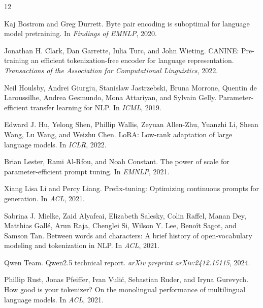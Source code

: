 \documentclass{article}
\begin{document}
\begin{thebibliography}{12}

Kaj Bostrom and Greg Durrett.
\newblock Byte pair encoding is suboptimal for language model pretraining.
\newblock In \emph{Findings of EMNLP}, 2020.

Jonathan H. Clark, Dan Garrette, Iulia Turc, and John Wieting.
\newblock CANINE: Pre-training an efficient tokenization-free encoder for language representation.
\newblock \emph{Transactions of the Association for Computational Linguistics}, 2022.

Neil Houlsby, Andrei Giurgiu, Stanislaw Jastrzebski, Bruna Morrone, Quentin de Laroussilhe, Andrea Gesmundo, Mona Attariyan, and Sylvain Gelly.
\newblock Parameter-efficient transfer learning for NLP.
\newblock In \emph{ICML}, 2019.

Edward J. Hu, Yelong Shen, Phillip Wallis, Zeyuan Allen-Zhu, Yuanzhi Li, Shean Wang, Lu Wang, and Weizhu Chen.
\newblock LoRA: Low-rank adaptation of large language models.
\newblock In \emph{ICLR}, 2022.

Brian Lester, Rami Al-Rfou, and Noah Constant.
\newblock The power of scale for parameter-efficient prompt tuning.
\newblock In \emph{EMNLP}, 2021.

Xiang Lisa Li and Percy Liang.
\newblock Prefix-tuning: Optimizing continuous prompts for generation.
\newblock In \emph{ACL}, 2021.

Sabrina J. Mielke, Zaid Alyafeai, Elizabeth Salesky, Colin Raffel, Manan Dey, Matthias Gall{\'e}, Arun Raja, Chenglei Si, Wilson Y. Lee, Beno{\^i}t Sagot, and Samson Tan.
\newblock Between words and characters: A brief history of open-vocabulary modeling and tokenization in NLP.
\newblock In \emph{ACL}, 2021.

Qwen Team.
\newblock Qwen2.5 technical report.
\newblock \emph{arXiv preprint arXiv:2412.15115}, 2024.

Phillip Rust, Jonas Pfeiffer, Ivan Vuli{\'c}, Sebastian Ruder, and Iryna Gurevych.
\newblock How good is your tokenizer? On the monolingual performance of multilingual language models.
\newblock In \emph{ACL}, 2021.


\end{thebibliography}
\end{document}
